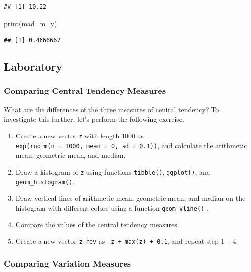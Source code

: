 \documentclass[
]{article}
\newenvironment{Shaded}{\begin{snugshade}}{\end{snugshade}}
\newcommand{\FunctionTok}[1]{\textcolor[rgb]{0.00,0.00,0.00}{#1}}
\newcommand{\NormalTok}[1]{#1}
\begin{document}
\begin{verbatim}
## [1] 10.22
\end{verbatim}

\begin{Shaded}
\begin{Highlighting}[]
\FunctionTok{print}\NormalTok{(mad\_m\_y)}
\end{Highlighting}
\end{Shaded}

\begin{verbatim}
## [1] 0.4666667
\end{verbatim}

\hypertarget{laboratory}{%
\subsection{Laboratory}\label{laboratory}}

\hypertarget{comparing-central-tendency-measures}{%
\subsubsection{Comparing Central Tendency Measures}\label{comparing-central-tendency-measures}}

What are the differences of the three measures of central tendency? To investigate this further, let's perform the following exercise.

\begin{enumerate}
\def\labelenumi{\arabic{enumi}.}
\item
  Create a new vector \texttt{z} with length \(1000\) as \texttt{exp(rnorm(n\ =\ 1000,\ mean\ =\ 0,\ sd\ =\ 0.1))}, and calculate the arithmetic mean, geometric mean, and median.
\item
  Draw a histogram of \texttt{z} using functions \texttt{tibble()}, \texttt{ggplot()}, and \texttt{geom\_histogram()}.
\item
  Draw vertical lines of arithmetic mean, geometric mean, and median on the histogram with different colors using a function \texttt{geom\_vline()} .
\item
  Compare the values of the central tendency measures.
\item
  Create a new vector \texttt{z\_rev} as \texttt{-z\ +\ max(z)\ +\ 0.1}, and repeat step 1 -- 4.
\end{enumerate}

\hypertarget{comparing-variation-measures}{%
\subsubsection{Comparing Variation Measures}\label{comparing-variation-measures}}
\end{document}
